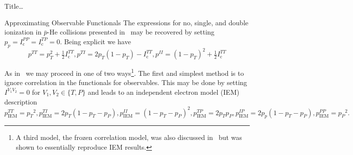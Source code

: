 \documentclass[letterpaper, 11 pt]{report}
\begin{document}
\begin{chapter}{ Title\dots \label{chap:p-he2p-he}}
\begin{section}{Approximating Observable Functionals \label{sec:phe2p-obs}}
      The expressions for no, single, and double ionization in $\bar{p}$-He collisions presented
      in~\cite{pbarhe} may be recovered by setting $p_p = I^{PP}_\mathrm{c} = I^{TP}_\mathrm{c} = 0$.
      Being explicit we have
      \begin{subequations} \label{eq:prob-pbarhe}
         \begin{equation} \label{eq:ptt-pbarhe}
            p^{TT} = p_T^2 + \tfrac{1}{2} I^{TT}_\mathrm{c},
         \end{equation}
         \begin{equation} \label{eq:pti-pbarhe}
            p^{TI} = 2p_T(1 - p_T) - I^{TT}_\mathrm{c},
         \end{equation}
         \begin{equation} \label{eq:pii-pbarhe}
            p^{II} = (1 - p_T)^2 + \tfrac{1}{2} I^{TT}_\mathrm{c}
         \end{equation}
      \end{subequations}

      As in~\cite{pbarhe} we may proceed in one of two ways\footnote{A third model, the frozen
      correlation model, was also discussed in~\cite{pbarhe} but was shown to essentially reproduce IEM
      results.}. The first and simplest method is to ignore correlation in the functionals for
      observables. This may be done by setting $I^{V_1 V_2} = 0$ for $V_1,V_2 \in \{T,P\}$ and leads to
      an independent electron model (IEM) description
      \begin{subequations} \label{eq:prob-iem}
         \begin{equation} \label{eq:ptt-iem}
            p^{TT}_\mathrm{IEM} = {p_T}^2,
         \end{equation}
         \begin{equation} \label{eq:pti-iem}
            p^{TI}_\mathrm{IEM} = 2p_T(1 - p_T - p_P),
         \end{equation}
         \begin{equation} \label{eq:pii-iem}
            p^{II}_\mathrm{IEM} = (1 - p_T - p_P)^2,
         \end{equation}
         \begin{equation} \label{eq:ptp-iem}
            p^{TP}_\mathrm{IEM} = 2 p_T p_P,
         \end{equation}
         \begin{equation} \label{eq:pip-iem}
            p^{IP}_\mathrm{IEM} = 2 p_p (1 - p_T - p_P),
         \end{equation}
         \begin{equation} \label{eq:ppp-iem}
            p^{PP}_\mathrm{IEM} = {p_P}^2.
         \end{equation}
      \end{subequations}


\end{section}
\end{chapter}
\end{document}

